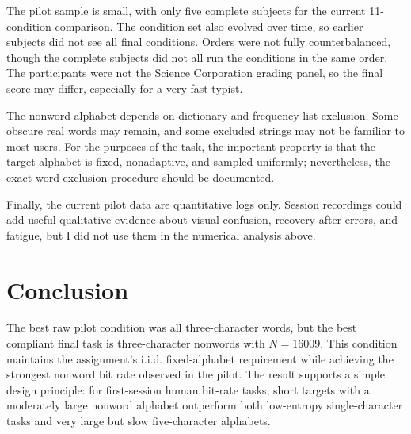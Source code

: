 \documentclass[11pt]{article}
\begin{document}
The pilot sample is small, with only five complete subjects for the current 11-condition comparison. The condition set also evolved over time, so earlier subjects did not see all final conditions. Orders were not fully counterbalanced, though the complete subjects did not all run the conditions in the same order. The participants were not the Science Corporation grading panel, so the final score may differ, especially for a very fast typist.

The nonword alphabet depends on dictionary and frequency-list exclusion. Some obscure real words may remain, and some excluded strings may not be familiar to most users. For the purposes of the task, the important property is that the target alphabet is fixed, nonadaptive, and sampled uniformly; nevertheless, the exact word-exclusion procedure should be documented.

Finally, the current pilot data are quantitative logs only. Session recordings could add useful qualitative evidence about visual confusion, recovery after errors, and fatigue, but I did not use them in the numerical analysis above.

\section{Conclusion}

The best raw pilot condition was all three-character words, but the best compliant final task is three-character nonwords with \(N=16009\). This condition maintains the assignment's i.i.d. fixed-alphabet requirement while achieving the strongest nonword bit rate observed in the pilot. The result supports a simple design principle: for first-session human bit-rate tasks, short targets with a moderately large nonword alphabet outperform both low-entropy single-character tasks and very large but slow five-character alphabets.
\end{document}
